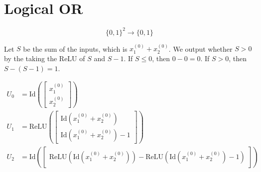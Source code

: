 \documentclass{article}
\newcommand{\relu}{\mathrm{ReLU}}
\newcommand{\id}{\mathrm{Id}}
\newcommand{\DrawNeuron}[5]{%
  \node[neuron] (#1) at #2 {};
  \node[vect]   at ($(#1.center)+(-0.5,0)$) {#4};
  \draw         ($(#1.center)+(0.2,1.2cm)$)--($(#1.center)+(0.2,-1.2cm)$);
  \node[actlabel]at ($(#1.center)+(0.9,0)$) {#5};
  \node[above=0pt of #1] {#3};
}
\begin{document}
\begin{center}
\end{center}

\section{Logical OR}

\[
  \{0,1\}^2 \to \{0,1\}
\]

Let $S$ be the sum of the inputs, which is $x^{(0)}_1 + x^{(0)}_2$.
We output whether $S>0$ by the taking the ReLU
of $S$ and $S-1$. If $S\le 0$, then $0-0=0$. If $S>0$, then $S-(S-1)=1$.

\begin{align*}
  U_0 &= \id\left(
    \begin{bmatrix}
      x^{(0)}_{1} \\
      x^{(0)}_{2}
  \end{bmatrix}\right) \\
  U_1 &= \relu\left(
    \begin{bmatrix}
      \id\left( x^{(0)}_{1} + x^{(0)}_{2} \right) \\
      \id\left( x^{(0)}_{1} + x^{(0)}_{2} \right) - 1
  \end{bmatrix}\right) \\
  U_2 &= \id\left(
    \begin{bmatrix}
      \relu\left( \id\left( x^{(0)}_{1} + x^{(0)}_{2} \right) \right)
      - \relu\left( \id\left( x^{(0)}_{1} + x^{(0)}_{2} \right) - 1 \right)
    \end{bmatrix}
  \right)
\end{align*}
\end{document}
